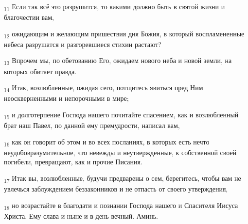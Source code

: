 \begin{tcolorbox}
\textsubscript{11} Если так всё это разрушится, то какими должно быть в святой жизни и благочестии вам,
\end{tcolorbox}
\begin{tcolorbox}
\textsubscript{12} ожидающим и желающим пришествия дня Божия, в который воспламененные небеса разрушатся и разгоревшиеся стихии растают?
\end{tcolorbox}
\begin{tcolorbox}
\textsubscript{13} Впрочем мы, по обетованию Его, ожидаем нового неба и новой земли, на которых обитает правда.
\end{tcolorbox}
\begin{tcolorbox}
\textsubscript{14} Итак, возлюбленные, ожидая сего, потщитесь явиться пред Ним неоскверненными и непорочными в мире;
\end{tcolorbox}
\begin{tcolorbox}
\textsubscript{15} и долготерпение Господа нашего почитайте спасением, как и возлюбленный брат наш Павел, по данной ему премудрости, написал вам,
\end{tcolorbox}
\begin{tcolorbox}
\textsubscript{16} как он говорит об этом и во всех посланиях, в которых есть нечто неудобовразумительное, что невежды и неутвержденные, к собственной своей погибели, превращают, как и прочие Писания.
\end{tcolorbox}
\begin{tcolorbox}
\textsubscript{17} Итак вы, возлюбленные, будучи предварены о сем, берегитесь, чтобы вам не увлечься заблуждением беззаконников и не отпасть от своего утверждения,
\end{tcolorbox}
\begin{tcolorbox}
\textsubscript{18} но возрастайте в благодати и познании Господа нашего и Спасителя Иисуса Христа. Ему слава и ныне и в день вечный. Аминь.
\end{tcolorbox}
